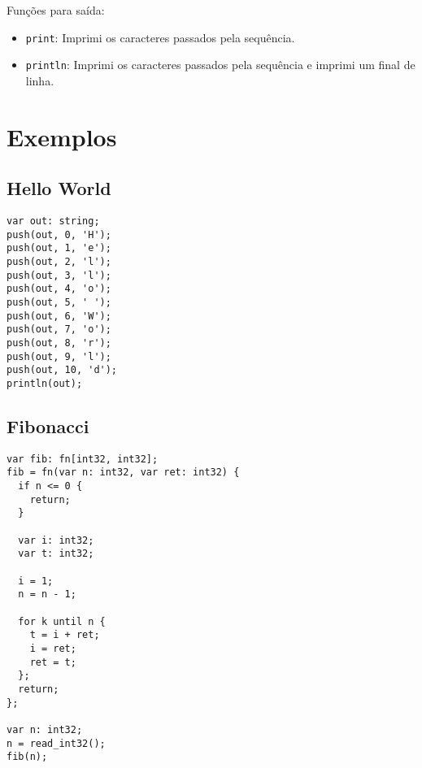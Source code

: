 \documentclass[12pt, a4paper]{article}
\begin{document}
Funções para saída:

\begin{itemize}
\item \texttt{print}: Imprimi os caracteres passados pela sequência.
\item \texttt{println}: Imprimi os caracteres passados pela sequência e imprimi
  um final de linha.
\end{itemize}

\section{Exemplos}

\subsection{Hello World}

\begin{verbatim}
var out: string;
push(out, 0, 'H');
push(out, 1, 'e');
push(out, 2, 'l');
push(out, 3, 'l');
push(out, 4, 'o');
push(out, 5, ' ');
push(out, 6, 'W');
push(out, 7, 'o');
push(out, 8, 'r');
push(out, 9, 'l');
push(out, 10, 'd');
println(out);
\end{verbatim}

\subsection{Fibonacci}

\begin{verbatim}
var fib: fn[int32, int32];
fib = fn(var n: int32, var ret: int32) {
  if n <= 0 {
    return;
  }

  var i: int32;
  var t: int32;

  i = 1;
  n = n - 1;

  for k until n {
    t = i + ret;
    i = ret;
    ret = t;
  };
  return;
};

var n: int32;
n = read_int32();
fib(n);
\end{verbatim}
\end{document}
